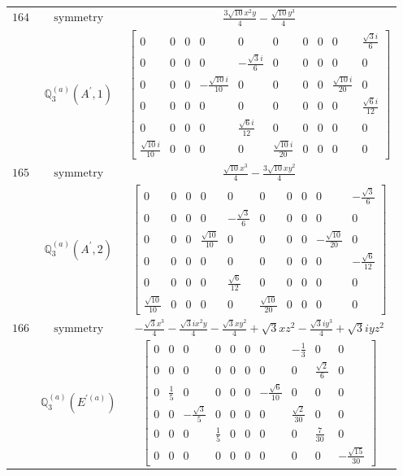 \documentclass[fleqn,8pt,landscape]{jsarticle}
\begin{document}
\begin{longtable}{ccc}
$ 164 $ & $ \text{symmetry} $ & $ \frac{3 \sqrt{10} x^{2} y}{4} - \frac{\sqrt{10} y^{3}}{4} $ \\
$  $ & $ \mathbb{Q}_{3}^{(a)}(A^{\prime},1) $ & $ \begin{bmatrix} 0 & 0 & 0 & 0 & 0 & 0 & 0 & 0 & 0 & \frac{\sqrt{3} i}{6} \\ 0 & 0 & 0 & 0 & - \frac{\sqrt{3} i}{6} & 0 & 0 & 0 & 0 & 0 \\ 0 & 0 & 0 & - \frac{\sqrt{10} i}{10} & 0 & 0 & 0 & 0 & \frac{\sqrt{10} i}{20} & 0 \\ 0 & 0 & 0 & 0 & 0 & 0 & 0 & 0 & 0 & \frac{\sqrt{6} i}{12} \\ 0 & 0 & 0 & 0 & \frac{\sqrt{6} i}{12} & 0 & 0 & 0 & 0 & 0 \\ \frac{\sqrt{10} i}{10} & 0 & 0 & 0 & 0 & \frac{\sqrt{10} i}{20} & 0 & 0 & 0 & 0 \end{bmatrix} $ \\ \hline
$ 165 $ & $ \text{symmetry} $ & $ \frac{\sqrt{10} x^{3}}{4} - \frac{3 \sqrt{10} x y^{2}}{4} $ \\
$  $ & $ \mathbb{Q}_{3}^{(a)}(A^{\prime},2) $ & $ \begin{bmatrix} 0 & 0 & 0 & 0 & 0 & 0 & 0 & 0 & 0 & - \frac{\sqrt{3}}{6} \\ 0 & 0 & 0 & 0 & - \frac{\sqrt{3}}{6} & 0 & 0 & 0 & 0 & 0 \\ 0 & 0 & 0 & \frac{\sqrt{10}}{10} & 0 & 0 & 0 & 0 & - \frac{\sqrt{10}}{20} & 0 \\ 0 & 0 & 0 & 0 & 0 & 0 & 0 & 0 & 0 & - \frac{\sqrt{6}}{12} \\ 0 & 0 & 0 & 0 & \frac{\sqrt{6}}{12} & 0 & 0 & 0 & 0 & 0 \\ \frac{\sqrt{10}}{10} & 0 & 0 & 0 & 0 & \frac{\sqrt{10}}{20} & 0 & 0 & 0 & 0 \end{bmatrix} $ \\ \hline
$ 166 $ & $ \text{symmetry} $ & $ - \frac{\sqrt{3} x^{3}}{4} - \frac{\sqrt{3} i x^{2} y}{4} - \frac{\sqrt{3} x y^{2}}{4} + \sqrt{3} x z^{2} - \frac{\sqrt{3} i y^{3}}{4} + \sqrt{3} i y z^{2} $ \\
$  $ & $ \mathbb{Q}_{3}^{(a)}(E^{\prime(a)}) $ & $ \begin{bmatrix} 0 & 0 & 0 & 0 & 0 & 0 & 0 & - \frac{1}{3} & 0 & 0 \\ 0 & 0 & 0 & 0 & 0 & 0 & 0 & 0 & \frac{\sqrt{2}}{6} & 0 \\ 0 & \frac{1}{5} & 0 & 0 & 0 & 0 & - \frac{\sqrt{6}}{10} & 0 & 0 & 0 \\ 0 & 0 & - \frac{\sqrt{3}}{5} & 0 & 0 & 0 & 0 & \frac{\sqrt{2}}{30} & 0 & 0 \\ 0 & 0 & 0 & \frac{1}{5} & 0 & 0 & 0 & 0 & \frac{7}{30} & 0 \\ 0 & 0 & 0 & 0 & 0 & 0 & 0 & 0 & 0 & - \frac{\sqrt{15}}{30} \end{bmatrix} $ \\ \hline

\end{longtable}
\end{document}
